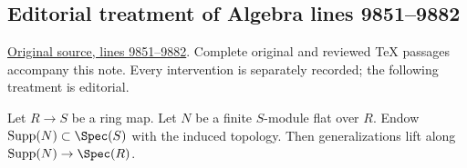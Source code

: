 \subsection{Editorial treatment of Algebra lines 9851--9882}

\hypertarget{algebra-context-115}{}

\noindent\href{https://github.com/stacks/stacks-project/blob/a04446e57ec1fbc252a871afcec7752fb2807b14/algebra.tex\#L9851}{Original source, lines 9851--9882}. Complete original and reviewed TeX passages accompany this note. Every intervention is separately recorded; the following treatment is editorial.


\begin{lemma}
\label{editorial-source-lemma-going-down-flat-module}
Let $R \to S$ be a ring map. Let $N$ be a finite $S$-module flat over $R$.
Endow $\text{Supp}(N) \subset \Spec(S)$ with the induced topology.
Then generalizations lift along $\text{Supp}(N) \to \Spec(R)$.
\end{lemma}

